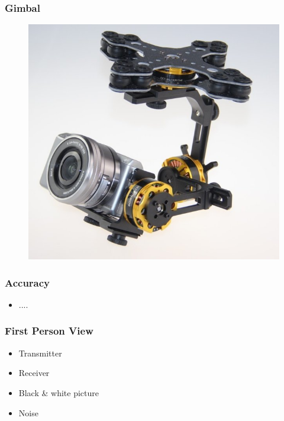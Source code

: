 \begin{frame}
\frametitle{Gimbal}

  \begin{figure}
  \includegraphics[scale=0.4]{pic/03_our-copter/gimbal.jpg}
  \end{figure}

  
\end{frame}

\begin{frame}
\frametitle{Accuracy}

  \begin{itemize}
    \item ....
  \end{itemize}  
\end{frame}

\begin{frame}
\frametitle{First Person View}

  \begin{itemize}
    \item Transmitter    
    \item Receiver   
	\item Black \& white picture
	\item Noise 
  \end{itemize}
  
\end{frame}




